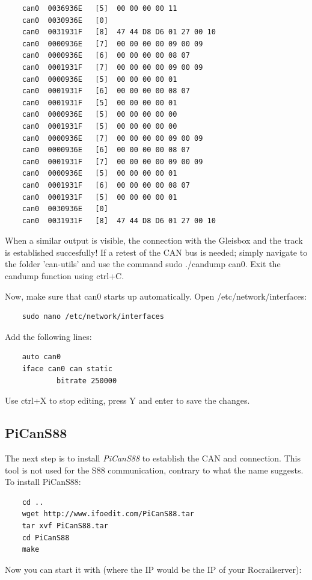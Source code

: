 \begin{verbatim}
	can0  0036936E   [5]  00 00 00 00 11
	can0  0030936E   [0]
	can0  0031931F   [8]  47 44 D8 D6 01 27 00 10
	can0  0000936E   [7]  00 00 00 00 09 00 09
	can0  0000936E   [6]  00 00 00 00 08 07
	can0  0001931F   [7]  00 00 00 00 09 00 09
	can0  0000936E   [5]  00 00 00 00 01
	can0  0001931F   [6]  00 00 00 00 08 07
	can0  0001931F   [5]  00 00 00 00 01
	can0  0000936E   [5]  00 00 00 00 00
	can0  0001931F   [5]  00 00 00 00 00
	can0  0000936E   [7]  00 00 00 00 09 00 09
	can0  0000936E   [6]  00 00 00 00 08 07
	can0  0001931F   [7]  00 00 00 00 09 00 09
	can0  0000936E   [5]  00 00 00 00 01
	can0  0001931F   [6]  00 00 00 00 08 07
	can0  0001931F   [5]  00 00 00 00 01
	can0  0030936E   [0]
	can0  0031931F   [8]  47 44 D8 D6 01 27 00 10
\end{verbatim}

When a similar output is visible, the connection with the Gleisbox and the track is established succesfully! If a retest of the CAN bus is needed; simply navigate to the folder 'can-utils' and use the command sudo ./candump can0. Exit the candump function using ctrl+C.

Now, make sure that can0 starts up automatically. Open /etc/network/interfaces:

\begin{verbatim}
	sudo nano /etc/network/interfaces
\end{verbatim}

Add the following lines:

\begin{verbatim}
	auto can0
	iface can0 can static
			bitrate 250000
\end{verbatim}

Use ctrl+X to stop editing, press Y and enter to save the changes.

\subsection{PiCanS88}
The next step is to install \textit{PiCanS88} to establish the CAN and connection. This tool is not used for the S88 communication, contrary to what the name suggests. To install PiCanS88:

\begin{verbatim}
	cd ..
	wget http://www.ifoedit.com/PiCanS88.tar
	tar xvf PiCanS88.tar
	cd PiCanS88
	make
\end{verbatim}

Now you can start it with (where the IP would be the IP of your Rocrailserver):

